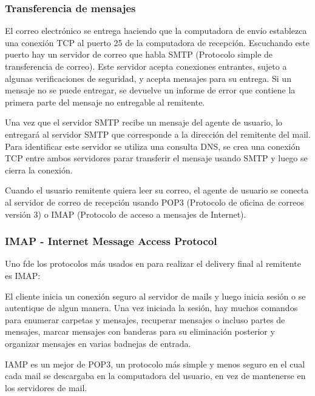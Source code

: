 \subsubsection*{Transferencia de mensajes}
El correo electrónico se entrega haciendo que la computadora de envío establezca una conexión TCP al puerto 25 de la computadora de recepción. Escuchando este puerto hay un servidor de correo que habla SMTP (Protocolo simple de transferencia de correo). Este servidor acepta conexiones entrantes, sujeto a algunas verificaciones de seguridad, y acepta mensajes para su entrega. Si un mensaje no se puede entregar, se devuelve un informe de error que contiene la primera parte del mensaje no entregable al remitente.

Una vez que el servidor SMTP recibe un mensaje del agente de usuario, lo entregará al servidor SMTP que corresponde a la dirección del remitente del mail. Para identificar este servidor se utiliza una consulta DNS, se crea una conexión TCP entre ambos servidores parar transferir el mensaje usando SMTP y luego se cierra la conexión.

Cuando el usuario remitente quiera leer su correo, el agente de usuario se conecta al servidor de correo de recepción usando POP3 (Protocolo de oficina de correos versión 3) o IMAP (Protocolo de acceso a mensajes de Internet).

\subsubsection*{IMAP - Internet Message Access Protocol}
Uno fde los protocolos más usados en para realizar el delivery final al remitente es IMAP:

El cliente inicia un conexión seguro al servidor de mails y luego inicia sesión o se autentique de algun manera. Una vez iniciada la sesión, hay muchos comandos para enumerar carpetas y mensajes, recuperar mensajes o incluso partes de mensajes, marcar mensajes con banderas para su eliminación posterior y organizar mensajes en varias badnejas de entrada.

IAMP es un mejor de POP3, un protocolo más simple y menos seguro en el cual cada mail se descargaba en la computadora del usuario, en vez de mantenerse en los servidores de mail. 

